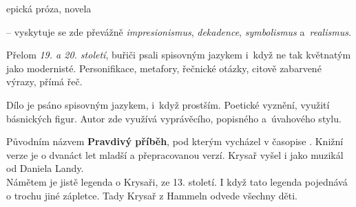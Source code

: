 \documentclass{extarticle} %
\begin{document}

\noindent epická próza, novela

\noindent{} -- vyskytuje se zde převážně \textit{impresionismus}, \textit{dekadence},
\textit{symbolismus} a~\textit{realismus}.

\noindent Přelom \textit{19. a 20. století}, buřiči psali spisovným jazykem i~když ne tak květnatým jako modernisté.
Personifikace, metafory, řečnické otázky, citově zabarvené výrazy, přímá řeč.



\noindent Dílo je psáno spisovným jazykem, i~když prostším.
Poetické vyznění, využití básnických figur.
Autor zde využívá vyprávěcího, popisného a~úvahového stylu.

\noindent Původním názvem \textbf{Pravdivý příběh}, pod kterým vycházel v časopise .
Knižní verze je o dvanáct let mladší a přepracovanou verzí.
Krysař vyšel i jako muzikál od Daniela Landy. \\
Námětem je jistě legenda o Krysaři, ze 13. století.
I když tato legenda pojednává o trochu jiné zápletce.
Tady Krysař z Hammeln odvede všechny děti.
\end{document}
